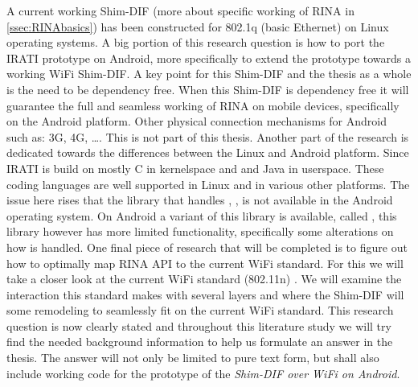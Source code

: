 A current working Shim-DIF (more about specific working of RINA in \ref{ssec:RINAbasics}) has been constructed for 802.1q (basic Ethernet) on Linux operating systems. A big portion of this research question is how to port the IRATI prototype on Android, more specifically to extend the prototype towards a working WiFi Shim-DIF. A key point for this Shim-DIF and the thesis as a whole is the need to be dependency free. When this Shim-DIF is dependency free it will guarantee the full and seamless working of RINA on mobile devices, specifically on the Android platform. Other physical connection mechanisms for Android such as: 3G, 4G, \ldots. This is not part of this thesis.
\npar
Another part of the research is dedicated towards the differences between the Linux and Android platform. Since IRATI is build on mostly C in kernelspace and \cpp and Java in userspace.  These coding languages are well supported in Linux and in various other platforms. The issue here rises that the library that handles \cpp, , is not available in the Android operating system. On Android a variant of this library is available, called , this library however has more limited functionality, specifically some alterations on how \cpp is handled.
\npar
One final piece of research that will be completed is to figure out how to optimally map RINA API to the current WiFi standard. For this we will take a closer look at the current WiFi standard (802.11n) \citep{eldadperahia2008, sixtoortiz2009, thomaspaul2008}. We will examine the interaction this standard makes with several layers and where the Shim-DIF will some remodeling to seamlessly fit on the current WiFi standard.
\npar
This research question is now clearly stated and throughout this literature study we will try find the needed background information to help us formulate an answer in the thesis. The answer will not only be limited to pure text form, but shall also include working code for the prototype of the \emph{Shim-DIF over WiFi on Android}. 


